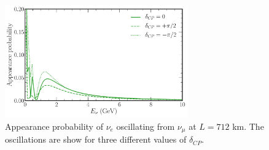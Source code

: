 \begin{figure} %
    \includegraphics[origin=c,width=0.7\textwidth]{diagrams/3-theory/explore_osc_cp_probs.pdf}
    \caption[osc cp probs short]
    {Appearance probability of $\nu_{e}$ oscillating from $\nu_{\mu}$ at $L=712$ km. The
        oscillations are show for three different values of $\delta_{CP}$.}
    \label{fig:osc_cp_probs}
\end{figure}
